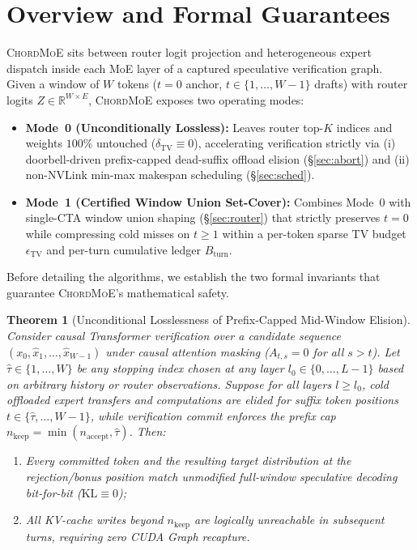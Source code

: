\documentclass[10pt,twocolumn]{article}
\newtheorem{theorem}{Theorem}
\theoremstyle{definition}
\begin{document}
\section{Overview and Formal Guarantees}
\label{sec:overview}

\textsc{ChordMoE} sits between router logit projection and heterogeneous expert dispatch inside each MoE layer of a captured speculative verification graph. Given a window of $W$ tokens ($t=0$ anchor, $t \in \{1,\dots,W-1\}$ drafts) with router logits $Z \in \mathbb{R}^{W \times E}$, \textsc{ChordMoE} exposes two operating modes:
\begin{itemize}
  \item \textbf{Mode~0 (Unconditionally Lossless):} Leaves router top-$K$ indices and weights $100\%$ untouched ($\delta_{\mathrm{TV}} \equiv 0$), accelerating verification strictly via (i) doorbell-driven prefix-capped dead-suffix offload elision (\S\ref{sec:abort}) and (ii) non-NVLink min-max makespan scheduling (\S\ref{sec:sched}).
  \item \textbf{Mode~1 (Certified Window Union Set-Cover):} Combines Mode~0 with single-CTA window union shaping (\S\ref{sec:router}) that strictly preserves $t=0$ while compressing cold misses on $t \ge 1$ within a per-token sparse TV budget $\epsilon_{\mathrm{TV}}$ and per-turn cumulative ledger $B_{\text{turn}}$.
\end{itemize}

Before detailing the algorithms, we establish the two formal invariants that guarantee \textsc{ChordMoE}'s mathematical safety.

\begin{theorem}[Unconditional Losslessness of Prefix-Capped Mid-Window Elision]
\label{thm:lossless}
Consider causal Transformer verification over a candidate sequence $(x_0, \hat{x}_1, \dots, \hat{x}_{W-1})$ under causal attention masking ($A_{t,s} = 0$ for all $s > t$). Let $\hat{\tau} \in \{1, \dots, W\}$ be any stopping index chosen at any layer $l_0 \in \{0, \dots, L-1\}$ based on arbitrary history or router observations. Suppose for all layers $l \ge l_0$, cold offloaded expert transfers and computations are elided for suffix token positions $t \in \{\hat{\tau}, \dots, W-1\}$, while verification commit enforces the prefix cap $n_{\mathrm{keep}} = \min(n_{\mathrm{accept}}, \hat{\tau})$. Then:
\begin{enumerate}
  \item Every committed token and the resulting target distribution at the rejection/bonus position match unmodified full-window speculative decoding bit-for-bit ($\mathrm{KL} \equiv 0$);
  \item All KV-cache writes beyond $n_{\mathrm{keep}}$ are logically unreachable in subsequent turns, requiring zero CUDA Graph recapture.
\end{enumerate}
\end{theorem}
\end{document}
